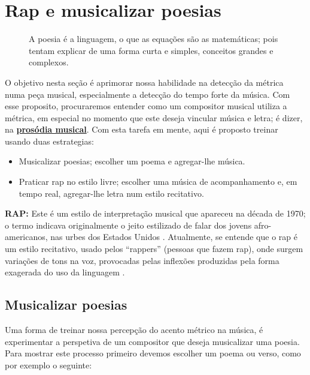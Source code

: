 \newpage
\section{Rap e musicalizar poesias}

\begin{figure}[b!]
\begin{FraseFernandoPR}
A poesia é a linguagem, o que as equações são as matemáticas;
pois tentam explicar de uma forma curta e simples,
conceitos grandes e complexos. %
\end{FraseFernandoPR}
\end{figure}

O objetivo nesta seção é aprimorar nossa habilidade na detecção da métrica numa peça musical,
especialmente a detecção do tempo forte da música.
Com esse proposito, procuraremos entender como um compositor musical utiliza a métrica,
em especial no momento que este deseja vincular música e letra;
é dizer, na \hyperref[sec:ProsodiaMusical]{\textbf{prosódia musical}}. 
Com esta tarefa em mente, aqui é proposto treinar usando duas estrategias:
\begin{itemize}
\item Musicalizar poesias; escolher um poema e agregar-lhe música.
\item Praticar rap no estilo livre; escolher uma música de acompanhamento e, em tempo real, 
 agregar-lhe letra num estilo recitativo.
\end{itemize}


\begin{tcbinformation} 
\textbf{RAP:}
\label{ref:RAP}
 Este é um estilo de interpretação musical que apareceu na década de 1970;
o termo indicava originalmente o jeito estilizado de falar dos jovens afro-americanos, 
nas urbes dos Estados Unidos  \cite[pp. 1250]{latham2008diccionario}.
Atualmente, se entende que o rap é um estilo recitativo,
usado pelos ``rappers'' (pessoas que fazem rap),
onde surgem variações de tons na voz, 
provocadas pelas inflexões produzidas pela forma exagerada do uso da linguagem \cite[pp. 1250]{latham2008diccionario}.
\end{tcbinformation} 


\subsection{Musicalizar poesias}
\label{subsec:musicalizarpoesias}
Uma forma de treinar nossa percepção do acento métrico na música, 
é experimentar a perspetiva de um compositor que deseja musicalizar uma poesia.
Para mostrar este processo primeiro devemos escolher um poema ou verso,
como por exemplo o seguinte:

